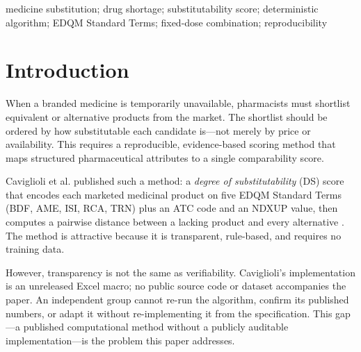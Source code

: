 \documentclass[12pt,twocolumn,a4paper]{elsarticle}
\begin{document}
\begin{frontmatter}
\begin{abstract}
\textbf{Conclusions.} The implementation independently reproduces the available labelled examples of the published specification under a documented interpretation, with honest documentation of where the published tables are internally inconsistent. The fixed-dose-combination extension is explicitly labelled as our own preliminary adaptation and is unvalidated against published ground truth. No clinical interchangeability or therapeutic-equivalence claim is made. The implementation, test suite, and generated outputs are maintained in the authors' project directory; a public repository has not yet been released.
\end{abstract}

\begin{keyword}
medicine substitution; drug shortage; substitutability score; deterministic algorithm; EDQM Standard Terms; fixed-dose combination; reproducibility
\end{keyword}

\end{frontmatter}

\twocolumn

\section{Introduction}
\label{sec:intro}

When a branded medicine is temporarily unavailable, pharmacists must shortlist equivalent or alternative products from the market. The shortlist should be ordered by how substitutable each candidate is---not merely by price or availability. This requires a reproducible, evidence-based scoring method that maps structured pharmaceutical attributes to a single comparability score.

Caviglioli et al.\citep{caviglioli2025medicine} published such a method: a \emph{degree of substitutability} (DS) score that encodes each marketed medicinal product on five EDQM Standard Terms (BDF, AME, ISI, RCA, TRN) plus an ATC code and an NDXUP value, then computes a pairwise distance between a lacking product and every alternative \citep{caviglioli2025medicine}. The method is attractive because it is transparent, rule-based, and requires no training data.

However, transparency is not the same as verifiability. Caviglioli's implementation is an unreleased Excel macro; no public source code or dataset accompanies the paper. An independent group cannot re-run the algorithm, confirm its published numbers, or adapt it without re-implementing it from the specification. This gap---a published computational method without a publicly auditable implementation---is the problem this paper addresses.
\end{document}
